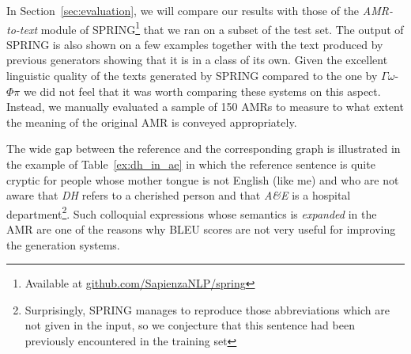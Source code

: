 \documentclass[12pt]{article}
\newcommand{\systeme}[1]{\textsc{#1}}
\newcommand{\gophipy}{$\Gamma\omega$-$\Phi\pi$}
\newcommand{\spring}{\systeme{SPRING}}
\newcommand{\representation}[1]{\textsf{#1}}
\newcommand{\AMR}{\representation{AMR}}
\begin{document}
In Section~\ref{sec:evaluation}, we will compare our results with those of the \emph{AMR-to-text} module of \spring{}\footnote{Available at \url{github.com/SapienzaNLP/spring}} that we ran on a subset of the test set. The output of \spring{} is also shown on a few examples together with the text produced by previous generators showing that it is in a class of its own. Given the excellent linguistic quality of the texts generated by \spring{} compared to the one by \gophipy{} we did not feel that it was worth comparing these systems on this aspect.  Instead, we manually evaluated a sample of 150 AMRs to measure to what extent the meaning of the original AMR is conveyed appropriately.

The wide gap between the reference and the corresponding graph is illustrated in the example of Table~\ref{ex:dh_in_ae} in which the reference sentence is quite cryptic for people whose mother tongue is not English (like me) and who are not aware that \emph{DH} refers to a cherished person and that \emph{A\&E} is a hospital department\footnote{Surprisingly, \spring{} manages to reproduce those abbreviations which are not given in the input, so we conjecture that this sentence had been previously encountered in the training set}. Such colloquial expressions whose semantics is \emph{expanded} in the \AMR{} are one of the reasons why BLEU scores are not very useful for improving the generation systems. 
\end{document}
